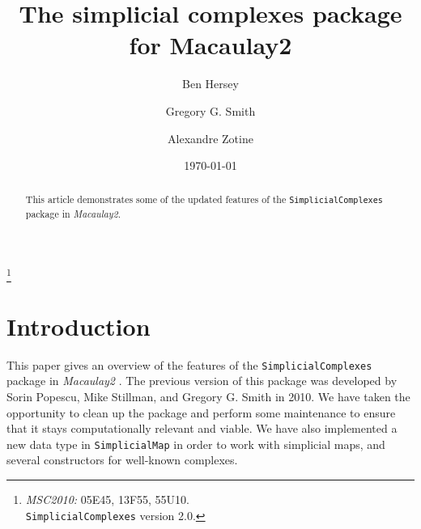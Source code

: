 \documentclass[12pt,leqno]{amsart}
\theoremstyle{definition}
\begin{document}
\title[Simplicial Complexes]{The simplicial complexes package for Macaulay2}
\author[B.~Hersey]{Ben Hersey}
\address{Ben Hersey: Department of Mathematics and Statistics, Queen's University, Kingston, Ontario, K7L 3N6;
  {\normalfont \texttt{b.hersey@queensu.ca}}}

\author[G.G.~Smith]{Gregory G.{} Smith}
\address{Gregory G.{} Smith: Department of Mathematics and Statistics, Queen's
  University, Kingston, Ontario, K7L 3N6, Canada; {\normalfont
    \texttt{ggsmith@mast.queensu.ca}}}

\author[A.~Zotine]{Alexandre Zotine}
\address{Alexandre Zotine: Department of Mathematics and Statistics, Queen's University, Kingston, Ontario, K7L 3N6;
  {\normalfont \texttt{18az45@queensu.ca}}}

\thanks{\emph{MSC2010:} 05E45, 13F55, 55U10. \\ \texttt{SimplicialComplexes} version 2.0.
}
\date{\today}

\begin{abstract}
  This article demonstrates some of the updated features of the \texttt{SimplicialComplexes} package in \emph{Macaulay2}.
\end{abstract}

\maketitle


\addtocounter{lemma}{-1}

\noindent

\section{Introduction}
\label{S:Introduction}

This paper gives an overview of the features of the \texttt{SimplicialComplexes} package in \emph{Macaulay2} \cite{M2}. The previous version of this package was developed by Sorin Popescu, Mike Stillman, and Gregory G. Smith in 2010. We have taken the opportunity to clean up the package and perform some maintenance to ensure that it stays computationally relevant and viable. We have also implemented a new data type in \texttt{SimplicialMap} in order to work with simplicial maps, and several constructors for well-known complexes.
\end{document}
